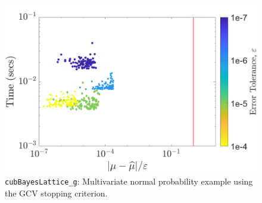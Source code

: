 \documentclass{iitthesis}          %
\newcommand{\code}[1]{\texttt{#1}}
\begin{document}
\begin{figure}
	\centering
	\includegraphics[width=0.95\linewidth]{"MVN_guaranteed_time_GCV_C2sin_d2_r2_2018-Sep-6"}
	\caption[MVN guaranteed: GCV]{\code{cubBayesLattice\_g}: Multivariate normal probability example using the GCV stopping criterion.}
	\label{fig:mvn-guaranteed-GCV}
\end{figure}
\end{document}
